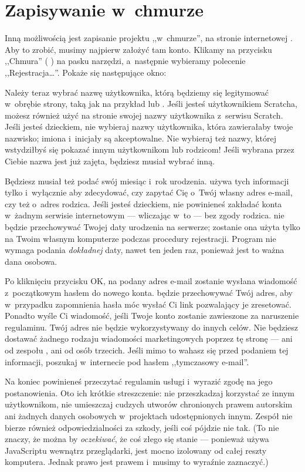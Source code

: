 \documentclass[a4paper]{report}
\begin{document}
\section{Zapisywanie w~chmurze}

Inną możliwością jest zapisanie projektu ,,w~chmurze'', na stronie internetowej . Aby to zrobić, musimy najpierw założyć tam konto. Klikamy na przycisku ,,Chmura'' (\,\,) na pasku narzędzi, a~następnie wybieramy polecenie ,,Rejestracja\ldots''. Pokaże się następujące okno:\nopagebreak


Należy teraz wybrać nazwę użytkownika, którą będziemy się legitymować w~obrębie strony, taką jak na przykład  lub . Jeśli jesteś użytkownikiem Scratcha, możesz również użyć na stronie  swojej nazwy użytkownika z~serwisu Scratch. Jeśli jesteś dzieckiem, nie wybieraj nazwy użytkownika, która zawierałaby twoje nazwisko; imiona i~inicjały są akceptowalne. Nie wybieraj też nazwy, której wstydziłbyś się pokazać innym użytkownikom lub rodzicom! Jeśli wybrana przez Ciebie nazwa jest już zajęta, będziesz musiał wybrać inną.

Będziesz musiał też podać swój miesiąc i~rok urodzenia. \Snap{} używa tych informacji tylko i~wyłącznie aby zdecydować, czy zapytać Cię o~Twój własny adres e-mail, czy też o~adres rodzica. Jeśli jesteś dzieckiem, nie powinieneś zakładać konta w~żadnym serwisie internetowym --- wliczając w~to  --- bez zgody rodzica. \Snap{} nie będzie przechowywać Twojej daty urodzenia na serwerze; zostanie ona użyta tylko na Twoim własnym komputerze podczas procedury rejestracji. Program nie wymaga podania \emph{dokładnej} daty, nawet ten jeden raz, ponieważ jest to ważna dana osobowa.

Po kliknięciu przycisku OK, na podany adres e-mail zostanie wysłana wiadomość z~początkowym hasłem do nowego konta. \Snap{} będzie przechowywać Twój adres, aby w~przypadku zapomnienia hasła móc wysłać Ci link pozwalający je zresetować. Ponadto \Snap{} wyśle Ci wiadomość, jeśli Twoje konto zostanie zawieszone za naruszenie regulaminu. Twój adres nie będzie wykorzystywany do innych celów. Nie będziesz dostawać żadnego rodzaju wiadomości marketingowych poprzez tę stronę --- ani od zespołu , ani od osób trzecich. Jeśli mimo to wahasz się przed podaniem tej informacji, poszukaj w~internecie pod hasłem ,,tymczasowy e-mail''.

Na koniec powinieneś przeczytać regulamin usługi i~wyrazić zgodę na jego postanowienia. Oto ich krótkie streszczenie: nie przeszkadzaj korzystać ze  innym użytkownikom, nie umieszczaj cudzych utworów chronionych prawem autorskim ani żadnych danych osobowych w~projektach udostępnionych innym. Zespół  nie bierze również odpowiedzialności za szkody, jeśli coś pójdzie nie tak. (To nie znaczy, że można by \emph{oczekiwać}, że coś złego się stanie --- ponieważ \Snap{} używa JavaScriptu wewnątrz przeglądarki, jest mocno izolowany od całej reszty komputera. Jednak prawo jest prawem i~musimy to wyraźnie zaznaczyć.)
\end{document}
